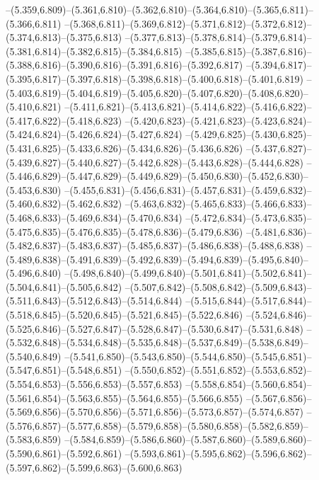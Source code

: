   --(5.359,6.809)--(5.361,6.810)--(5.362,6.810)--(5.364,6.810)--(5.365,6.811)--(5.366,6.811)%
  --(5.368,6.811)--(5.369,6.812)--(5.371,6.812)--(5.372,6.812)--(5.374,6.813)--(5.375,6.813)%
  --(5.377,6.813)--(5.378,6.814)--(5.379,6.814)--(5.381,6.814)--(5.382,6.815)--(5.384,6.815)%
  --(5.385,6.815)--(5.387,6.816)--(5.388,6.816)--(5.390,6.816)--(5.391,6.816)--(5.392,6.817)%
  --(5.394,6.817)--(5.395,6.817)--(5.397,6.818)--(5.398,6.818)--(5.400,6.818)--(5.401,6.819)%
  --(5.403,6.819)--(5.404,6.819)--(5.405,6.820)--(5.407,6.820)--(5.408,6.820)--(5.410,6.821)%
  --(5.411,6.821)--(5.413,6.821)--(5.414,6.822)--(5.416,6.822)--(5.417,6.822)--(5.418,6.823)%
  --(5.420,6.823)--(5.421,6.823)--(5.423,6.824)--(5.424,6.824)--(5.426,6.824)--(5.427,6.824)%
  --(5.429,6.825)--(5.430,6.825)--(5.431,6.825)--(5.433,6.826)--(5.434,6.826)--(5.436,6.826)%
  --(5.437,6.827)--(5.439,6.827)--(5.440,6.827)--(5.442,6.828)--(5.443,6.828)--(5.444,6.828)%
  --(5.446,6.829)--(5.447,6.829)--(5.449,6.829)--(5.450,6.830)--(5.452,6.830)--(5.453,6.830)%
  --(5.455,6.831)--(5.456,6.831)--(5.457,6.831)--(5.459,6.832)--(5.460,6.832)--(5.462,6.832)%
  --(5.463,6.832)--(5.465,6.833)--(5.466,6.833)--(5.468,6.833)--(5.469,6.834)--(5.470,6.834)%
  --(5.472,6.834)--(5.473,6.835)--(5.475,6.835)--(5.476,6.835)--(5.478,6.836)--(5.479,6.836)%
  --(5.481,6.836)--(5.482,6.837)--(5.483,6.837)--(5.485,6.837)--(5.486,6.838)--(5.488,6.838)%
  --(5.489,6.838)--(5.491,6.839)--(5.492,6.839)--(5.494,6.839)--(5.495,6.840)--(5.496,6.840)%
  --(5.498,6.840)--(5.499,6.840)--(5.501,6.841)--(5.502,6.841)--(5.504,6.841)--(5.505,6.842)%
  --(5.507,6.842)--(5.508,6.842)--(5.509,6.843)--(5.511,6.843)--(5.512,6.843)--(5.514,6.844)%
  --(5.515,6.844)--(5.517,6.844)--(5.518,6.845)--(5.520,6.845)--(5.521,6.845)--(5.522,6.846)%
  --(5.524,6.846)--(5.525,6.846)--(5.527,6.847)--(5.528,6.847)--(5.530,6.847)--(5.531,6.848)%
  --(5.532,6.848)--(5.534,6.848)--(5.535,6.848)--(5.537,6.849)--(5.538,6.849)--(5.540,6.849)%
  --(5.541,6.850)--(5.543,6.850)--(5.544,6.850)--(5.545,6.851)--(5.547,6.851)--(5.548,6.851)%
  --(5.550,6.852)--(5.551,6.852)--(5.553,6.852)--(5.554,6.853)--(5.556,6.853)--(5.557,6.853)%
  --(5.558,6.854)--(5.560,6.854)--(5.561,6.854)--(5.563,6.855)--(5.564,6.855)--(5.566,6.855)%
  --(5.567,6.856)--(5.569,6.856)--(5.570,6.856)--(5.571,6.856)--(5.573,6.857)--(5.574,6.857)%
  --(5.576,6.857)--(5.577,6.858)--(5.579,6.858)--(5.580,6.858)--(5.582,6.859)--(5.583,6.859)%
  --(5.584,6.859)--(5.586,6.860)--(5.587,6.860)--(5.589,6.860)--(5.590,6.861)--(5.592,6.861)%
  --(5.593,6.861)--(5.595,6.862)--(5.596,6.862)--(5.597,6.862)--(5.599,6.863)--(5.600,6.863)%
